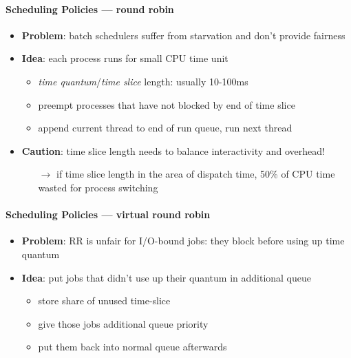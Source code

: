 \paragraph{Scheduling Policies --- round robin}
\begin{itemize}
  \item \textbf{Problem}: batch schedulers suffer from starvation and don't provide fairness
  \item \textbf{Idea}: each process runs for small CPU time unit
  \begin{itemize}
    \item \emph{time quantum}/\emph{time slice} length: usually 10-100ms
    \item preempt processes that have not blocked by end of time slice
    \item append current thread to end of run queue, run next thread
  \end{itemize}
  \item \textbf{Caution}: time slice length needs to balance interactivity and overhead!
  \begin{itemize}
    \item[$ \to $] if time slice length in the area of dispatch time, 50\% of CPU time wasted for process switching
  \end{itemize}
\end{itemize}

\paragraph{Scheduling Policies --- virtual round robin}
\begin{itemize}
  \item \textbf{Problem}: RR is unfair for I/O-bound jobs: they block before using up time quantum
  \item \textbf{Idea}: put jobs that didn't use up their quantum in additional queue
  \begin{itemize}
    \item store share of unused time-slice
    \item give those jobs additional queue priority
    \item put them back into normal queue afterwards
  \end{itemize}
\end{itemize}

